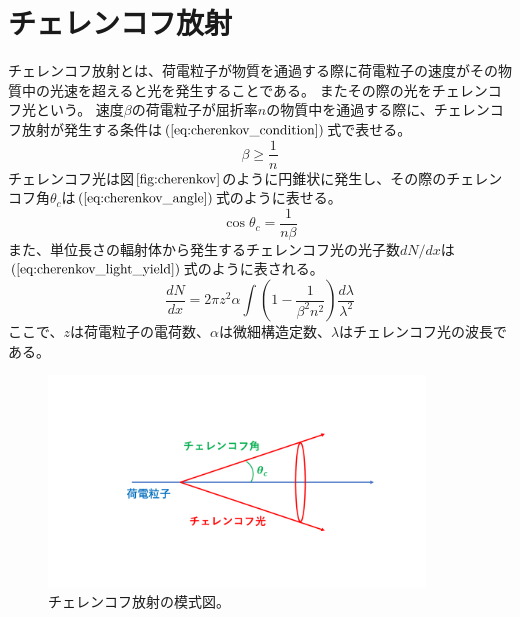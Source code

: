 \section{チェレンコフ放射}
チェレンコフ放射とは、荷電粒子が物質を通過する際に荷電粒子の速度がその物質中の光速を超えると光を発生することである。
またその際の光をチェレンコフ光という。
速度$\beta$の荷電粒子が屈折率$n$の物質中を通過する際に、チェレンコフ放射が発生する条件は$(\ref{eq:cherenkov_condition})$式で表せる。
\begin{equation}
  \label{eq:cherenkov_condition}
  \beta \ge \frac{1}{n}
\end{equation}
チェレンコフ光は図$\ref{fig:cherenkov}$のように円錐状に発生し、その際のチェレンコフ角$\theta_{c}$は$(\ref{eq:cherenkov_angle})$式のように表せる。
\begin{equation}
  \label{eq:cherenkov_angle}
  \cos \theta_{c} = \frac{1}{n\beta}
\end{equation}
また、単位長さの輻射体から発生するチェレンコフ光の光子数$dN/dx$は$(\ref{eq:cherenkov_light_yield})$式のように表される。
\begin{equation}
  \label{eq:cherenkov_light_yield}
  \frac{dN}{dx} = 2 \pi z^2 \alpha \int{\left(1-\frac{1}{\beta^2 n^2}\right)\frac{d\lambda}{\lambda^2}}
\end{equation}
ここで、$z$は荷電粒子の電荷数、$\alpha$は微細構造定数、$\lambda$はチェレンコフ光の波長である。
\begin{figure}[htbp]
  \centering
  \includegraphics[width=10cm]{images/chapter2/cherenkov.pdf}
  \caption[チェレンコフ放射の模式図]{チェレンコフ放射の模式図。}\label{fig:cherenkov}
\end{figure}
